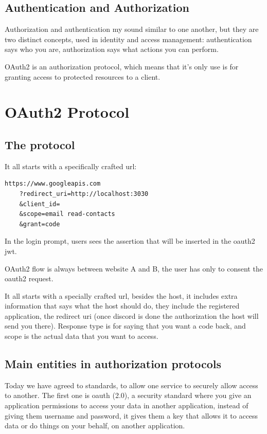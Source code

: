 \documentclass[20pt]{style}
\begin{document}
\subsection{Authentication and Authorization}
Authorization and authentication my sound similar to one another, but they are
two distinct concepts, used in identity and access management:
authentication says who you are, authorization says what actions you can
perform.

OAuth2 is an authorization protocol, which means that it's only use is for
granting access to protected resources to a client.

\section{OAuth2 Protocol}
\subsection{The protocol}
It all starts with a specifically crafted url:
\begin{lstlisting}
https://www.googleapis.com
    ?redirect_uri=http://localhost:3030
    &client_id=
    &scope=email read-contacts
    &grant=code
\end{lstlisting}

In the login prompt, users sees the assertion that will be inserted in the
oauth2 jwt.

OAuth2 flow is always between website A and B, the user has only to consent the
oauth2 request.

It all starts with a specially crafted url, besides the host, it includes extra
information that says what the host should do, they include the registered
application, the redirect uri (once discord is done the authorization the host
will send you there). Response type is for saying that you want a code back, and
scope is the actual data that you want to access.


\subsection{Main entities in authorization protocols}

Today we have agreed to standards, to allow one service to securely allow access
to another.
The first one is oauth (2.0), a security standard where you give an application
permissions to access your data in another application, instead of giving them
username and password, it gives them a key that allows it to access data or do
things on your behalf, on another application.
\end{document}

